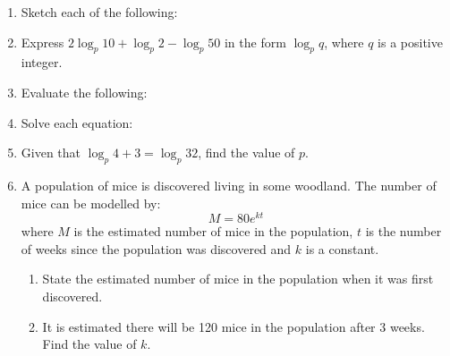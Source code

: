 \documentclass[
  11pt,
  openany]{book}
\begin{document}
\begin{enumerate}
    \item Sketch each of the following:
    \begin{enumerate}
    \end{enumerate}
    \item Express $2\log_p{10}+\log_p{2}-\log_p{50}$ in the form $\log_p{q}$, where $q$ is a positive integer.
    \item Evaluate the following:
    \begin{enumerate}
    \end{enumerate}
    \item Solve each equation: 
    \begin{enumerate}
    \end{enumerate}
    \item Given that $\log_{p}{4}+3=\log_p{32}$, find the value of $p$.
    \item A population of mice is discovered living in some woodland. The number of mice can be modelled by:
    \[M=80e^{kt}\]
    where $M$ is the estimated number of mice in the population, $t$ is the number of weeks since the population was discovered and $k$ is a constant.
    \begin{enumerate}
        \item State the estimated number of mice in the population when it was first discovered.
        \item It is estimated there will be 120 mice in the population after 3 weeks. Find the value of $k$.

\end{enumerate}
\end{enumerate}
\end{document}
